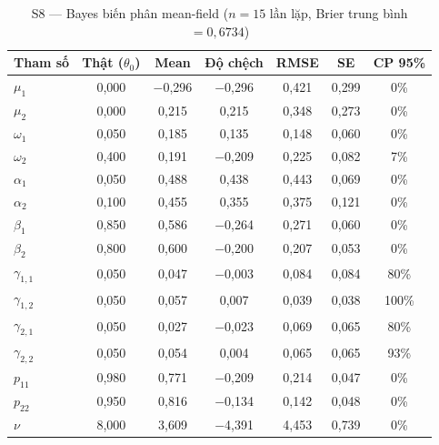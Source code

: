 \documentclass[11pt,a4paper]{article}
\begin{document}
\begin{table}[H]\centering\scriptsize
\caption{S8 --- Bayes biến phân mean-field ($n=15$ lần lặp, Brier trung bình $=0{,}6734$)}
\begin{tabularx}{\textwidth}{l C C C C C C}
\toprule
\textbf{Tham số} & \textbf{Thật ($\theta_0$)} & \textbf{Mean} & \textbf{Độ chệch} & \textbf{RMSE} & \textbf{SE} & \textbf{CP 95\%} \\
\midrule
$\mu_1$ & 0{,}000 & $-$0{,}296 & $-$0{,}296 & 0{,}421 & 0{,}299 & 0\% \\
$\mu_2$ & 0{,}000 & 0{,}215 & 0{,}215 & 0{,}348 & 0{,}273 & 0\% \\
$\omega_1$ & 0{,}050 & 0{,}185 & 0{,}135 & 0{,}148 & 0{,}060 & 0\% \\
$\omega_2$ & 0{,}400 & 0{,}191 & $-$0{,}209 & 0{,}225 & 0{,}082 & 7\% \\
$\alpha_1$ & 0{,}050 & 0{,}488 & 0{,}438 & 0{,}443 & 0{,}069 & 0\% \\
$\alpha_2$ & 0{,}100 & 0{,}455 & 0{,}355 & 0{,}375 & 0{,}121 & 0\% \\
$\beta_1$ & 0{,}850 & 0{,}586 & $-$0{,}264 & 0{,}271 & 0{,}060 & 0\% \\
$\beta_2$ & 0{,}800 & 0{,}600 & $-$0{,}200 & 0{,}207 & 0{,}053 & 0\% \\
$\gamma_{1,1}$ & 0{,}050 & 0{,}047 & $-$0{,}003 & 0{,}084 & 0{,}084 & 80\% \\
$\gamma_{1,2}$ & 0{,}050 & 0{,}057 & 0{,}007 & 0{,}039 & 0{,}038 & 100\% \\
$\gamma_{2,1}$ & 0{,}050 & 0{,}027 & $-$0{,}023 & 0{,}069 & 0{,}065 & 80\% \\
$\gamma_{2,2}$ & 0{,}050 & 0{,}054 & 0{,}004 & 0{,}065 & 0{,}065 & 93\% \\
$p_{11}$ & 0{,}980 & 0{,}771 & $-$0{,}209 & 0{,}214 & 0{,}047 & 0\% \\
$p_{22}$ & 0{,}950 & 0{,}816 & $-$0{,}134 & 0{,}142 & 0{,}048 & 0\% \\
$\nu$ & 8{,}000 & 3{,}609 & $-$4{,}391 & 4{,}453 & 0{,}739 & 0\% \\
\bottomrule
\end{tabularx}
\end{table}

\bigskip
\end{document}
